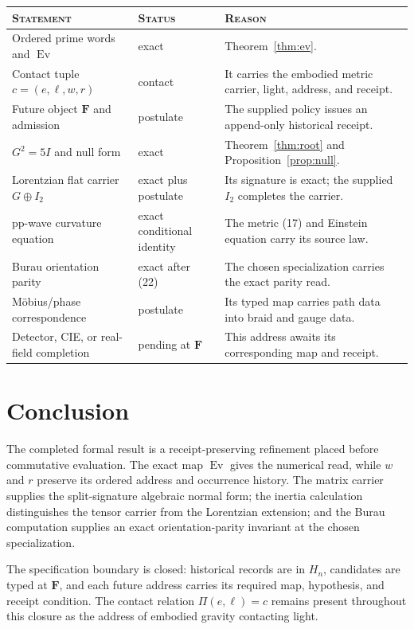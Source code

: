 \documentclass[10pt]{article}
\theoremstyle{remark}
\newcommand{\Ev}{\operatorname{Ev}}
\begin{document}
\begin{center}
\begin{tabular}{@{}L{4.0cm}L{2.3cm}L{5.8cm}@{}}
\toprule
\textsc{Statement} & \textsc{Status} & \textsc{Reason}\\
\midrule
Ordered prime words and $\Ev$ & exact & Theorem~\ref{thm:ev}.\\
Contact tuple $c=(e,\ell,w,r)$ & contact & It carries the embodied metric carrier, light, address, and receipt.\\
Future object $\mathbf F$ and admission & postulate & The supplied policy issues an append-only historical receipt.\\
$G^2=5I$ and null form & exact & Theorem~\ref{thm:root} and Proposition~\ref{prop:null}.\\
Lorentzian flat carrier $G\oplus I_2$ & exact plus postulate & Its signature is exact; the supplied $I_2$ completes the carrier.\\
pp-wave curvature equation & exact conditional identity & The metric (17) and Einstein equation carry its source law.\\
Burau orientation parity & exact after (22) & The chosen specialization carries the exact parity read.\\
M\"obius/phase correspondence & postulate & Its typed map carries path data into braid and gauge data.\\
Detector, CIE, or real-field completion & pending at $\mathbf F$ & This address awaits its corresponding map and receipt.\\
\bottomrule
\end{tabular}
\end{center}

\section{Conclusion}

The completed formal result is a receipt-preserving refinement placed before
commutative evaluation.  The exact map $\Ev$ gives the numerical read, while
$w$ and $r$ preserve its ordered address and occurrence history.  The matrix
carrier supplies the split-signature algebraic normal form; the inertia
calculation distinguishes the tensor carrier from the Lorentzian extension;
and the Burau computation supplies an exact orientation-parity invariant at
the chosen specialization.

The specification boundary is closed: historical records are in $H_n$,
candidates are typed at $\mathbf F$, and each future address carries its
required map, hypothesis, and receipt condition.  The contact relation
\(\Pi(e,\ell)=c\) remains present throughout this closure as the address of
embodied gravity contacting light.
\end{document}
